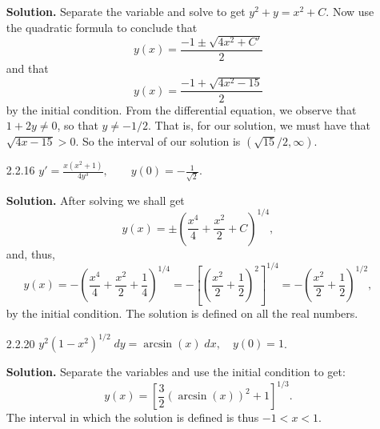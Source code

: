 \begin{enumerate}
      \textbf{Solution.} Separate the variable and solve to get
      $y^2 + y = x^2 + C$. Now use the quadratic formula to conclude that
      $$y(x) = \frac{-1 \pm \sqrt{4x^2 + C'}}{2}$$
      and that
      $$y(x) = \frac{-1 + \sqrt{4x^2 - 15}}{2}$$
      by the initial condition. From the differential equation, we observe that
      $1 + 2y \neq 0$, so that $y \neq -1/2$. That is, for our solution, we must
      have that $\sqrt{4x - 15} > 0$. So the interval of our solution is
      $(\sqrt{15}/2, \infty)$.
   \item[2.2.16]  $y' = \frac{x(x^2 + 1)}{4y^3}, \qquad
                        y(0) = -\frac{1}{\sqrt{2}}$.


      \textbf{Solution.} After solving we shall get
      $$y(x) = \pm\left(\frac{x^4}{4} + \frac{x^2}{2} + C\right)^{1/4},$$
      and, thus,
      $$y(x) = -\left(\frac{x^4}{4} + \frac{x^2}{2} +\frac{1}{4}\right)^{1/4} =
        -\left[\left(\frac{x^2}{2} + \frac{1}{2}\right)^2\right]^{1/4} = 
         -\left(\frac{x^2}{2} + \frac{1}{2}\right)^{1/2},$$
      by the initial condition. The solution is defined on all the real
      numbers.
   \item[2.2.20]  $y^2(1-x^2)^{1/2}\;dy = \arcsin(x)\;dx, \quad y(0) = 1$.

      \textbf{Solution.} Separate the variables and use the initial condition to
      get:
      $$y(x) = \left[\frac{3}{2}(\arcsin(x))^2 + 1\right]^{1/3}.$$
      The interval in which the solution is defined is thus $-1 < x < 1$.
\end{enumerate}

